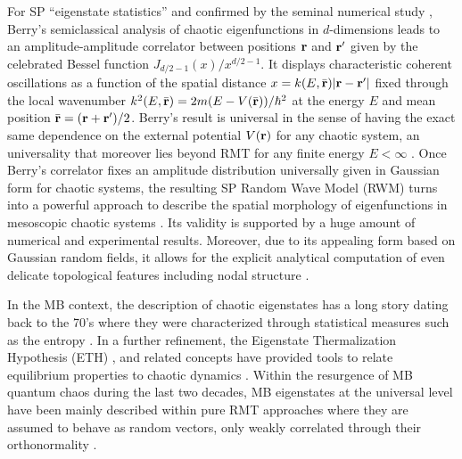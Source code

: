 \documentclass[prl,a4paper,twocolumn,superscriptaddress,floatfix]{revtex4-1}%
\begin{document}
For SP “eigenstate statistics” and confirmed by the
seminal numerical study \cite{mcdonaldSpectrumEigenfunctionsHamiltonian1979,mcdonaldWaveChaosStadium1988}, 
Berry's semiclassical analysis of chaotic eigenfunctions \cite{Berr4} in $d$-dimensions leads to an amplitude-amplitude correlator between positions ${\bf r}$ and ${\bf r'}$ given by the celebrated Bessel function $J_{d/2-1}(x)/x^{d/2-1}$. It displays characteristic coherent oscillations as a function of the spatial distance $x=k(E,\bar{{\bf r}})|{\bf r}-{\bf r'}|$ fixed through the local wavenumber $k^{2}(E,\bar{\bf r})=2m(E-V(\bar{\bf r}))/\hbar^{2}$ at the energy $E$ and mean position $\bar{{\bf r}}=({\bf r}+{\bf r'})/2$. Berry's result is universal in the sense of having the exact same dependence on the external potential $V({\bf r})$ for any chaotic system, an universality that moreover lies beyond  RMT for any finite energy $E < \infty$ . Once Berry's correlator fixes an amplitude distribution universally given in Gaussian form for chaotic  systems, the resulting SP Random Wave Model (RWM) \cite{Berr4,Sied1,JDUre} turns into a powerful approach to describe the spatial morphology of eigenfunctions in mesoscopic chaotic systems \cite{RWM3,Urbina06,RWM2}. Its validity is supported by a huge amount of numerical \cite{PhysRevA.37.3067,RWMBe3,bogomolny2002percolation} and experimental \cite{HJ1,HJ2,HJ3} results. Moreover, due to its appealing form based on Gaussian random fields, it allows for the explicit analytical computation of even delicate topological features \cite{RWMBe3,RWMBe4,Dennis1,Dennis2} including nodal structure \cite{bogomolny2002percolation,jainNodalPortraitsQuantum2017}.

In the MB context, the description of chaotic eigenstates has a long story dating back to the 70's where 
they were characterized through statistical measures such as the entropy \cite{lubkinEntropyNsystemIts1978,pageAverageEntropySubsystem1993,senAverageEntropyQuantum1996}. In a further refinement, %
the Eigenstate Thermalization Hypothesis (ETH) 
\cite{ETH1,ETH2,ETH3,ETH4}, 
and related concepts \cite{jainQuantumChaosRandom1997} have provided tools to relate equilibrium properties to chaotic dynamics \cite{ETH2,ALONSO1996812,Gaspard1997}. Within the resurgence of MB quantum chaos during the last two decades, MB eigenstates at the universal level have been mainly described within  pure RMT approaches where they are assumed to behave as random vectors, only weakly correlated through their orthonormality \cite{Rig1}.
\end{document}
